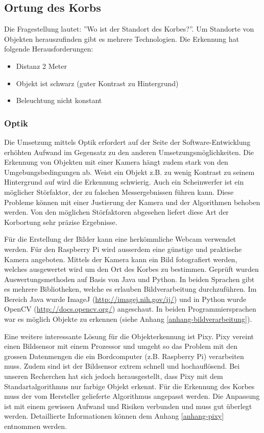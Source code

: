 \subsection{Ortung des Korbs}
\label{ssc_ortung_des_korbs}
Die Fragestellung lautet: ''Wo ist der Standort des Korbes?''. Um Standorte von Objekten herauszufinden gibt es mehrere Technologien. Die Erkennung hat folgende Herausforderungen:
\begin{itemize}
	\item Distanz 2 Meter
	\item Objekt ist schwarz (guter Kontrast zu Hintergrund)
	\item Beleuchtung nicht konstant
\end{itemize}

\subsubsection{Optik}
Die Umsetzung mittels Optik erfordert auf der Seite der Software-Entwicklung erhöhten Aufwand im Gegensatz zu den anderen Umsetzungsmöglichkeiten. Die Erkennung von Objekten mit einer Kamera hängt zudem stark von den Umgebungsbedingungen ab. Weist ein Objekt z.B. zu wenig Kontrast zu seinem Hintergrund auf wird die Erkennung schwierig. Auch ein Scheinwerfer ist ein möglicher Störfaktor, der zu falschen Messergebnissen führen kann. Diese Probleme können mit einer Justierung der Kamera und der Algorithmen behoben werden. Von den möglichen Störfaktoren abgesehen liefert diese Art der Korbortung sehr präzise Ergebnisse.

Für die Erstellung der Bilder kann eine herkömmliche Webcam verwendet werden. Für den Raspberry Pi wird ausserdem eine günstige und praktische Kamera angeboten. Mittels der Kamera kann ein Bild fotografiert werden, welches ausgewertet wird um den Ort des Korbes zu bestimmen. Geprüft wurden Auswertungsmethoden auf Basis von Java und Python. In beiden Sprachen gibt es mehrere Bibliotheken, welche es erlauben Bildverarbeitung durchzuführen. Im Bereich Java wurde ImageJ (\href{http://imagej.nih.gov/ij/}{http://imagej.nih.gov/ij/}) und in Python wurde OpenCV (\href{http://docs.opencv.org/}{http://docs.opencv.org/}) angeschaut. In beiden Programmiersprachen war es möglich Objekte zu erkennen (siehe Anhang \ref{anhang-bildverarbeitung}).

Eine weitere interessante Lösung für die Objekterkennung ist Pixy. Pixy vereint einen Bildsensor mit einem Prozessor und umgeht so das Problem mit den grossen Datenmengen die ein Bordcomputer (z.B. Raspberry Pi) verarbeiten muss. Zudem sind ist der Bildsensor extrem schnell und hochauflösend. Bei unseren Recherchen hat sich jedoch herausgestellt, dass Pixy mit dem Standartalgorithmus nur farbige Objekt erkennt. Für die Erkennung des Korbes muss der vom Hersteller gelieferte Algorithmus angepasst werden. Die Anpassung ist mit einem gewissen Aufwand und Risiken verbunden und muss gut überlegt werden. Detaillierte Informationen können dem Anhang \ref{anhang-pixy} entnommen werden.

